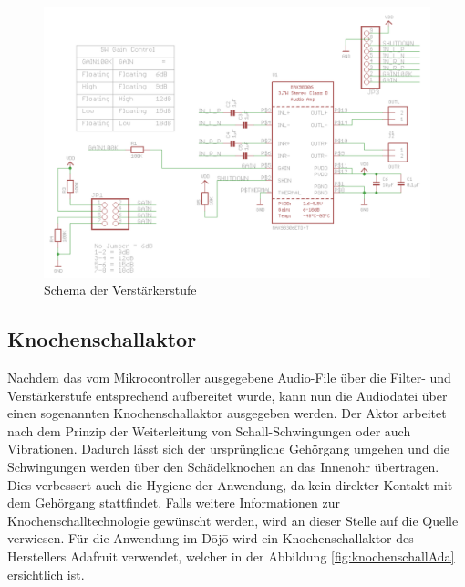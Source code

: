 \begin{figure}[H]
	\begin{center}
		\includegraphics[width=\textwidth]{data/Schema_Verstaerkerstufe.png}
		\caption[Verstärkerstufe \cite{Verstaerker_Schema}]{Schema der Verstärkerstufe} %
		\label{fig:verstaerkerstufe}
	\end{center}
\end{figure}

\subsection{Knochenschallaktor} \label{sec:knochenschallaktor}
Nachdem das vom Mikrocontroller ausgegebene Audio-File über die Filter- und Verstärkerstufe entsprechend aufbereitet wurde, kann nun die Audiodatei über einen sogenannten Knochenschallaktor ausgegeben werden. Der Aktor arbeitet nach dem Prinzip der Weiterleitung von Schall-Schwingungen oder auch Vibrationen. Dadurch lässt sich der ursprüngliche Gehörgang umgehen und die Schwingungen werden über den Schädelknochen an das Innenohr übertragen. Dies verbessert auch die Hygiene der Anwendung, da kein direkter Kontakt mit dem Gehörgang stattfindet\cite{Knochenschall}. Falls weitere Informationen zur Knochenschalltechnologie gewünscht werden, wird an dieser Stelle auf die Quelle \cite{Knochenschall_HDM_Stuttgart} verwiesen. Für die Anwendung im Dōjō wird ein Knochenschallaktor des Herstellers Adafruit verwendet, welcher in der Abbildung \ref{fig:knochenschallAda} ersichtlich ist.

